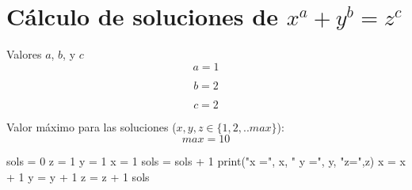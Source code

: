 \documentclass{article}
\begin{document}
\section{Cálculo de soluciones de $x^a + y^b = z^c$}

Valores $a$, $b$, y $c$
\begin{equation}
a = 1
\label{eq:calc:a}
\end{equation}

\begin{equation}
b = 2
\label{eq:calc:b}
\end{equation}

\begin{equation}
c = 2
\label{eq:calc:c}
\end{equation}

Valor máximo para las soluciones ($x, y, z \in \{1,2,..max\}$):
\begin{equation}
max = 10
\label{eq:calc:max}
\end{equation}

\begin{algorithm}
\caption{Número de soluciones}
\label{alg:calc:numsols}
\begin{algorithmic}
    \STATE sols = 0
    \STATE z = 1
        \STATE y = 1
            \STATE x = 1
                    \STATE sols = sols + 1
                    \STATE print("x =", x, " y =", y, "z=",z)
                \ENDIF
                \STATE x = x + 1
            \ENDWHILE
            \STATE y = y + 1
        \ENDWHILE
        \STATE z = z + 1
    \ENDWHILE
    \RETURN sols
\end{algorithmic}
\end{algorithm}
\end{document}
